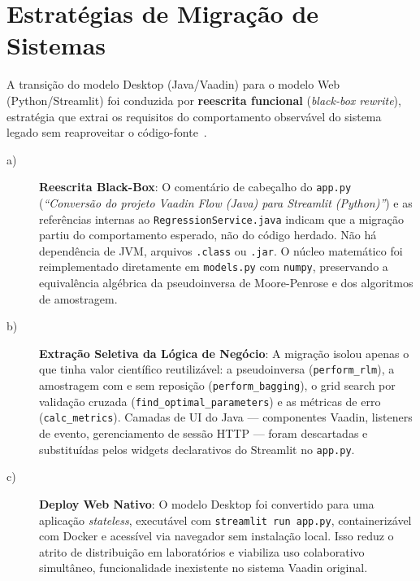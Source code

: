 \section{Estratégias de Migração de Sistemas}

A transição do modelo Desktop (Java/Vaadin) para o modelo Web (Python/Streamlit) foi
conduzida por \textbf{reescrita funcional} (\textit{black-box rewrite}), estratégia que
extrai os requisitos do comportamento observável do sistema legado sem reaproveitar o
código-fonte~\cite{becker2020}.

\begin{description}

\item[a)] \textbf{Reescrita Black-Box}: O comentário de cabeçalho do \texttt{app.py}
(\textit{``Conversão do projeto Vaadin Flow (Java) para Streamlit (Python)''}) e as
referências internas ao \texttt{RegressionService.java} indicam que a migração partiu do
comportamento esperado, não do código herdado. Não há dependência de JVM, arquivos
\texttt{.class} ou \texttt{.jar}. O núcleo matemático foi reimplementado diretamente em
\texttt{models.py} com \texttt{numpy}, preservando a equivalência algébrica da
pseudoinversa de Moore-Penrose e dos algoritmos de amostragem.

\item[b)] \textbf{Extração Seletiva da Lógica de Negócio}: A migração isolou apenas o
que tinha valor científico reutilizável: a pseudoinversa (\texttt{perform\_rlm}), a
amostragem com e sem reposição (\texttt{perform\_bagging}), o grid search por validação
cruzada (\texttt{find\_optimal\_parameters}) e as métricas de erro
(\texttt{calc\_metrics}). Camadas de UI do Java — componentes Vaadin, listeners de
evento, gerenciamento de sessão HTTP — foram descartadas e substituídas pelos widgets
declarativos do Streamlit no \texttt{app.py}.

\item[c)] \textbf{Deploy Web Nativo}: O modelo Desktop foi convertido para uma aplicação
\textit{stateless}, executável com \texttt{streamlit run app.py}, containerizável com
Docker e acessível via navegador sem instalação local. Isso reduz o atrito de distribuição
em laboratórios e viabiliza uso colaborativo simultâneo, funcionalidade inexistente no
sistema Vaadin original.

\end{description}

